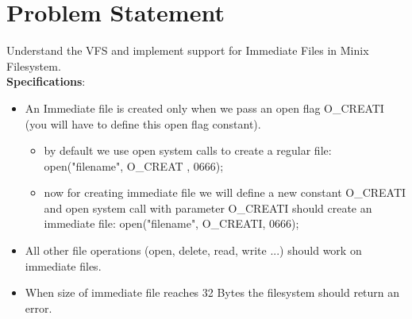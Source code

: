 \chapter{Problem Statement}

\vspace{10mm}

Understand the VFS and implement support for Immediate Files in Minix Filesystem.\\ \linebreak
 {\bf Specifications}:\\
\begin{itemize}
\item An Immediate file is created only when we pass an open flag O\_CREATI (you will have to define this open flag constant).
\begin{itemize}
\item by default we use open system calls to create a regular file:
    open("filename", O\_CREAT , 0666);
    
\item  now for creating immediate file we will define a new constant O\_CREATI and open system call with parameter O\_CREATI should create an immediate file:
    open("filename", O\_CREATI, 0666);   
\end{itemize}

\item All other file operations (open, delete, read, write ...) should work on immediate files.
\item When size of immediate file reaches 32 Bytes the filesystem should return an error. 

\end{itemize}


